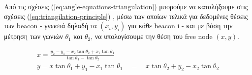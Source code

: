 Από τις σχέσεις (\ref{eq:angle-equations-triangulation}) μπορούμε να καταλήξουμε στις σχέσεις (\ref{eq:triangilation-principle}) \cite{triangulation-simple-equation}, μέσω 
των οποίων τελικά για δεδομένες θέσεις των beacon - γνωστά δηλαδή τα $(x_i,y_i)$ για κάθε beacon i - και με βάση την μέτρηση των γωνιών $\theta_1$ και $\theta_2$,
να υπολογίσουμε την θέση του free node $(x,y)$.

\begin{equation}
	\begin{gathered}
		x = \frac{y_2 - y_1-  x_2\tan \theta_2 + x_1\tan \theta_1}{\tan \theta_1 - \tan \theta_2} \\[4pt]
		y = x\tan \theta_1 + y_1 - x_1\tan \theta_1 \quad = \quad x\tan \theta_2 + y_2 - x_2\tan \theta_2    
	\end{gathered}
	\label{eq:triangilation-principle}
\end{equation}

